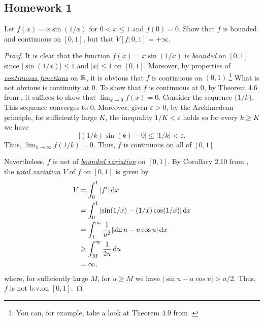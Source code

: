 \subsection{Homework 1}
\begin{problem}
Let $f(x)=x\sin(1/x)$ for $0<x\leq 1$ and $f(0)=0$. Show that $f$ is
bounded and continuous on $[0,1]$, but that $V[f;0,1]=+\infty$.
\end{problem}
\begin{proof}
  It is clear that the function $f(x)=x\sin(1/x)$ is
  \href{https://en.wikipedia.org/wiki/Bounded_function}{\emph{bounded}} on
  $[0,1]$ since $|{\sin(1/x)}|\leq 1$ and $|x|\leq 1$ on $[0,1]$. Moreover,
  by properties of
  \href{https://en.wikipedia.org/wiki/Continuous_function#Weierstrass_definition_.28epsilon.E2.80.93delta.29_of_continuous_functions}{\emph{continuous
      functions}} on $\mathbb{R}$, it is obvious that $f$ is continuous on
  $(0,1)$.\footnote{You can, for example, take a look at Theorem 4.9 from
    \cite[Ch.\@ 4, p.\@ 87]{rudin-1}.} What is not obvious is continuity at
  $0$. To show that $f$ is continuous at $0$, by Theorem 4.6 from
  \cite[Ch.\@ 4, p.\@ 86]{rudin-1}, it suffices to show that
  $\lim_{x\to 0}f(x)=0$. Consider the sequence $\{1/k\}$. This sequence
  converges to $0$. Moreover, given $\varepsilon>0$, by the Archimedean
  principle, for sufficiently large $K$, the inequality $1/K<\varepsilon$
  holds so for every $k\geq K$ we have
\begin{equation}
\label{eq:1:1}
\left|(1/k)\sin(k)-0\right|\leq
\left|1/k\right|<\varepsilon.
\end{equation}
Thus, $\lim_{k\to\infty}f(1/k)=0$. Thus, $f$ is continuous on all of
$[0,1]$.

Nevertheless, $f$ is not of
\href{https://en.wikipedia.org/wiki/Bounded_variation}{\emph{bounded
    variation}} on $[0,1]$. By Corollary 2.10 from \cite[Ch.\@ 2, p.\@
23]{wheeden-zygmund}, the
\href{https://en.wikipedia.org/wiki/Total_variation}{\emph{total
    variation}} $V$ of $f$ on $[0,1]$ is given by
\begin{equation}
\label{eq:1:2}
\begin{aligned}
V&=\int_0^1|f'|\mathop{}\!\mathrm{d} x\\
&=\int_0^1|{\sin(1/x)-(1/x)\cos(1/x)}|\mathop{}\!\mathrm{d} x\\
&=\int_1^\infty\frac{1}{u^2}|{\sin u-u\cos u}|\mathop{}\!\mathrm{d} x\\
&\geq\int_M^\infty \frac{1}{2u}\mathop{}\!\mathrm{d} u\\
&=\infty,
\end{aligned}
\end{equation}
where, for sufficiently large $M$, for $u\geq M$ we have $|{\sin u- u\cos
  u}|>u/2$. Thus, $f$ is not b.v.\@ on $[0,1]$.
\end{proof}

